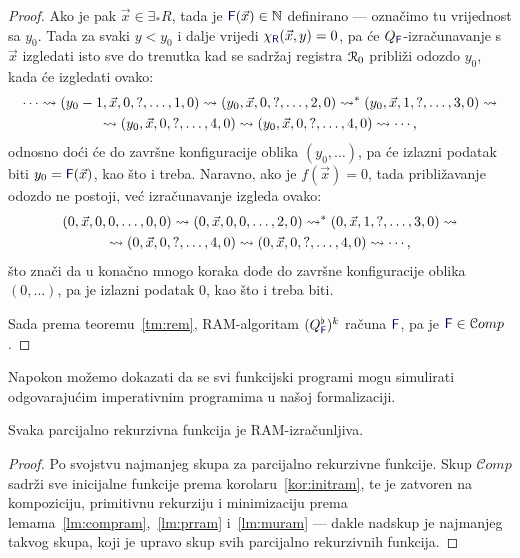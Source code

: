 \begin{proof}
Ako je pak $\vec x\in\exists_*R$, tada je $\f F(\vec x)\in\N$ definirano --- označimo tu vrijednost sa $y_0$. Tada za svaki $y<y_0$ i dalje vrijedi $\chi_{\f R}(\vec x,y)=0$, pa će $Q_{\f F}$-izračunavanje s $\vec x$ izgledati isto sve do trenutka kad se sadržaj registra $\mathcal R_{0}$ približi odozdo $y_0$, kada će izgledati ovako:
\begin{multline}
    \dotsb\leadsto(y_0-1,\vec x,0,?,\dotsc,1,0)\leadsto
    (y_0,\vec x,0,?,\dotsc,2,0)\leadsto^*
    (y_0,\vec x,1,?,\dotsc,3,0)\leadsto\\
    \leadsto(y_0,\vec x,0,?,\dotsc,4,0)\leadsto
    (y_0,\vec x,0,?,\dotsc,4,0)\leadsto\dotsb\text,
\end{multline}
odnosno doći će do završne konfiguracije oblika $(y_0,\dotsc)$, pa će izlazni podatak biti $y_0=\f F(\vec x)$, kao što i treba. Naravno, ako je $f(\vec x)=0$, tada približavanje odozdo ne postoji, već izračunavanje izgleda ovako:
\begin{multline}
    (0,\vec x,0,0,\dotsc,0,0)\leadsto
    (0,\vec x,0,0,\dotsc,2,0)\leadsto^*
    (0,\vec x,1,?,\dotsc,3,0)\leadsto\\
    \leadsto(0,\vec x,0,?,\dotsc,4,0)
    \leadsto(0,\vec x,0,?,\dotsc,4,0)\leadsto\dotsb\text,
\end{multline}
što znači da u konačno mnogo koraka dođe do završne konfiguracije oblika $(0,\dotsc)$, pa je izlazni podatak $0$, kao što i treba biti.

Sada prema teoremu~\ref{tm:rem}, RAM-algoritam $(Q_{\f F}^\flat)^k$ računa $\f F$, pa je $\f F\in\mathcal Comp$.
\end{proof}

Napokon možemo dokazati da se svi funkcijski programi mogu simulirati odgovarajućim imperativnim programima u našoj formalizaciji.

\begin{teorem}[{name=[RAM-izračunljivost parcijalno rekurzivnih funkcija]}]\label{tm:pir}
Svaka parcijalno rekurzivna funkcija je RAM-izračunljiva.
\end{teorem}
\begin{proof}
Po svojstvu najmanjeg skupa za parcijalno rekurzivne funkcije. Skup $\mathcal Comp$ sadrži sve inicijalne funkcije prema korolaru~\ref{kor:initram}, te je zatvoren na kompoziciju, primitivnu rekurziju i minimizaciju prema lemama~\ref{lm:compram},~\ref{lm:prram} i~\ref{lm:muram} --- dakle nadskup je najmanjeg takvog skupa, koji je upravo skup svih parcijalno rekurzivnih funkcija.
\end{proof}

